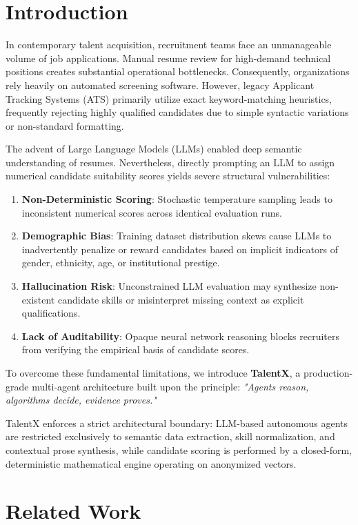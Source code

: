 \documentclass[conference]{IEEEtran}
\begin{document}
\section{Introduction}
\label{sec:intro}
In contemporary talent acquisition, recruitment teams face an unmanageable volume of job applications. Manual resume review for high-demand technical positions creates substantial operational bottlenecks. Consequently, organizations rely heavily on automated screening software. However, legacy Applicant Tracking Systems (ATS) primarily utilize exact keyword-matching heuristics, frequently rejecting highly qualified candidates due to simple syntactic variations or non-standard formatting.

The advent of Large Language Models (LLMs) enabled deep semantic understanding of resumes. Nevertheless, directly prompting an LLM to assign numerical candidate suitability scores yields severe structural vulnerabilities:
\begin{enumerate}
    \item \textbf{Non-Deterministic Scoring}: Stochastic temperature sampling leads to inconsistent numerical scores across identical evaluation runs.
    \item \textbf{Demographic Bias}: Training dataset distribution skews cause LLMs to inadvertently penalize or reward candidates based on implicit indicators of gender, ethnicity, age, or institutional prestige.
    \item \textbf{Hallucination Risk}: Unconstrained LLM evaluation may synthesize non-existent candidate skills or misinterpret missing context as explicit qualifications.
    \item \textbf{Lack of Auditability}: Opaque neural network reasoning blocks recruiters from verifying the empirical basis of candidate scores.
\end{enumerate}

To overcome these fundamental limitations, we introduce \textbf{TalentX}, a production-grade multi-agent architecture built upon the principle: \textit{"Agents reason, algorithms decide, evidence proves."} 

TalentX enforces a strict architectural boundary: LLM-based autonomous agents are restricted exclusively to semantic data extraction, skill normalization, and contextual prose synthesis, while candidate scoring is performed by a closed-form, deterministic mathematical engine operating on anonymized vectors.

\section{Related Work}
\label{sec:related}
\end{document}

